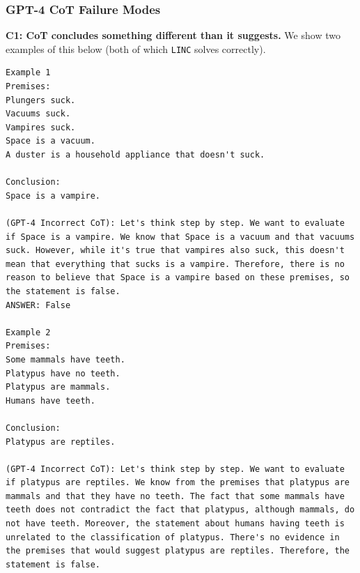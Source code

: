 \subsubsection{GPT-4 CoT Failure Modes}
\textbf{C1: CoT concludes something different than it suggests.} We show two examples of this below (both of which \texttt{LINC} solves correctly).
\begin{lstlisting}[breaklines=true]
Example 1
Premises:
Plungers suck.
Vacuums suck.
Vampires suck.
Space is a vacuum.
A duster is a household appliance that doesn't suck.

Conclusion:
Space is a vampire.

(GPT-4 Incorrect CoT): Let's think step by step. We want to evaluate if Space is a vampire. We know that Space is a vacuum and that vacuums suck. However, while it's true that vampires also suck, this doesn't mean that everything that sucks is a vampire. Therefore, there is no reason to believe that Space is a vampire based on these premises, so the statement is false.
ANSWER: False

Example 2
Premises:
Some mammals have teeth.
Platypus have no teeth.
Platypus are mammals.
Humans have teeth.

Conclusion:
Platypus are reptiles.

(GPT-4 Incorrect CoT): Let's think step by step. We want to evaluate if platypus are reptiles. We know from the premises that platypus are mammals and that they have no teeth. The fact that some mammals have teeth does not contradict the fact that platypus, although mammals, do not have teeth. Moreover, the statement about humans having teeth is unrelated to the classification of platypus. There's no evidence in the premises that would suggest platypus are reptiles. Therefore, the statement is false.
\end{lstlisting}

